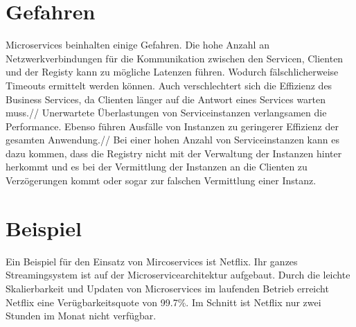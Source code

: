 \section{Gefahren}

Microservices beinhalten einige Gefahren. Die hohe Anzahl an Netzwerkverbindungen für die Kommunikation zwischen den Servicen, Clienten und der Registy kann zu mögliche Latenzen führen. Wodurch fälschlicherweise Timeouts ermittelt werden können. Auch verschlechtert sich die Effizienz des Business Services, da Clienten länger auf die Antwort eines Services warten muss.//
Unerwartete Überlastungen von Serviceinstanzen verlangsamen die Performance. Ebenso führen Ausfälle von Instanzen zu geringerer Effizienz der gesamten Anwendung.//
Bei einer hohen Anzahl von Serviceinstanzen kann es dazu kommen, dass die Registry nicht mit der Verwaltung der Instanzen hinter herkommt und es bei der Vermittlung der Instanzen an die Clienten zu Verzögerungen kommt oder sogar zur falschen Vermittlung einer Instanz.

\section{Beispiel}

Ein Beispiel für den Einsatz von Mircoservices ist Netflix. Ihr ganzes Streamingsystem ist auf der Microservicearchitektur aufgebaut. Durch die leichte Skalierbarkeit und Updaten von Microservices im laufenden Betrieb erreicht Netflix eine Verügbarkeitsquote von 99.7\%. Im Schnitt ist Netflix nur zwei Stunden im Monat nicht verfügbar.  